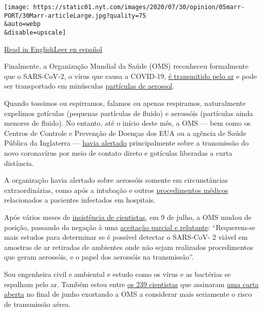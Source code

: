 \texttt{[image: https://static01.nyt.com/images/2020/07/30/opinion/05marr-PORT/30Marr-articleLarge.jpg?quality=75\\\&auto=webp\\\&disable=upscale]}

\href{https://www.nytimes.com/2020/07/30/opinion/coronavirus-aerosols.html}{Read
in
English}\href{https://www.nytimes.com/es/2020/08/01/espanol/opinion/coronavirus-aire.html}{Leer
en español}

Finalmente, a Organização Mundial da Saúde (OMS) reconheceu formalmente
que o SARS-CoV-2, o vírus que causa a COVID-19,
\href{https://www.nytimes.com/2020/07/09/health/virus-aerosols-who.html}{é
transmitido pelo ar} e pode ser transportado em minúsculas
\href{https://www.nature.com/articles/d41586-020-02058-1}{partículas de
aerossol}.

Quando tossimos ou espirramos, falamos ou apenas respiramos,
naturalmente expelimos gotículas (pequenas partículas de fluido) e
aerossóis (partículas ainda menores de fluido). No entanto, até o início
deste mês, a OMS --- bem como os Centros de Controle e Prevenção de
Doenças dos EUA ou a agência de Saúde Pública da Inglaterra ---
\href{https://www.who.int/news-room/commentaries/detail/modes-of-transmission-of-virus-causing-covid-19-implications-for-ipc-precaution-recommendations}{havia
alertado} principalmente sobre a transmissão do novo coronavírus por
meio de contato direto e gotículas liberadas a curta distância.

A organização havia alertado sobre aerossóis somente em circunstâncias
extraordinárias, como após a intubação e outros
\href{https://www.who.int/publications/i/item/WHO-2019-nCoV-IPC-2020.4}{procedimentos
médicos} relacionados a pacientes infectados em hospitais.

Após vários meses de
\href{https://www.nature.com/articles/d41586-020-00974-w\#ref-CR5}{insistência
de cientistas}, em 9 de julho, a OMS mudou de posição, passando da
negação à uma
\href{https://www.who.int/news-room/commentaries/detail/transmission-of-sars-cov-2-implications-for-infection-prevention-precautions}{aceitação
parcial e relutante}: ``Requerem-se mais estudos para determinar se é
possível detectar o SARS-CoV- 2 viável ​​em amostras de ar retiradas de
ambientes onde não sejam realizados procedimentos que geram aerossóis, e
o papel dos aerossóis na transmissão''.

Sou engenheira civil e ambiental e estudo como os vírus e as bactérias
se espalham pelo ar. Também estou entre
\href{https://www.nytimes.com/es/2020/07/06/espanol/ciencia-y-tecnologia/coronavirus-transmision-aire.html}{os
239 cientistas} que assinaram
\href{https://academic.oup.com/cid/article/doi/10.1093/cid/ciaa939/5867798}{uma
carta aberta} no final de junho exortando a OMS a considerar mais
seriamente o risco de transmissão aérea.


